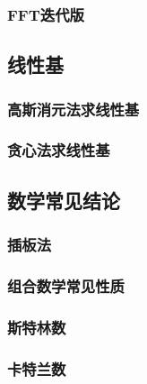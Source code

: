 \documentclass[10pt,a4paper]{article}
\begin{document}
\subsubsection{FFT迭代版}

\subsection{线性基}
\subsubsection{高斯消元法求线性基}
\begin{spacing}{1.5}

\end{spacing}

\subsubsection{贪心法求线性基}
\begin{spacing}{1.5}

\end{spacing}

\subsection{数学常见结论}
\subsubsection{插板法}
\begin{spacing}{1.5}

\end{spacing}
\subsubsection{组合数学常见性质}
\begin{spacing}{1.5}

\end{spacing}
\subsubsection{斯特林数}
\begin{spacing}{1.5}

\end{spacing}
\subsubsection{卡特兰数}
\begin{spacing}{1.5}

\end{spacing}
\end{document}
